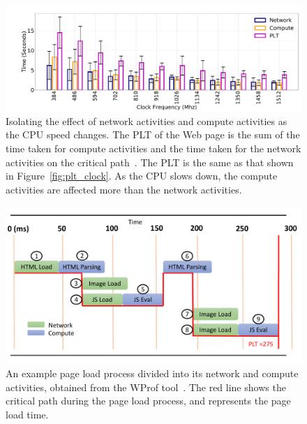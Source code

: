 
\begin{figure}[t]
  \centering
  \includegraphics[width=0.8\linewidth]{sections/device-work/plt-isolate.pdf}
    \caption{Isolating the effect of network activities and compute activities as the CPU speed changes. The PLT of the Web page is the sum of the time taken for compute activities and the time taken for the network activities on the critical path~\cite{wang2013demystifying,nejati2016depth}. The PLT is the same as that shown in Figure~\ref{fig:plt_clock}. As the CPU slows down, the compute activities are affected more than the network activities. }\vspace{-0.2in}
  \label{fig:plt_isolate}
\end{figure}

\begin{figure}[t]
  \centering
  \includegraphics[width=\linewidth]{sections/device-work/wprof-dp.pdf}
    \caption{An example page load process divided into its network and compute activities, obtained from the WProf tool~\cite{wang2013demystifying,nejati2016depth}. The red line shows the critical path during the page load process, and represents the page load time. }
  \label{fig:wprof-dp}
\end{figure}

